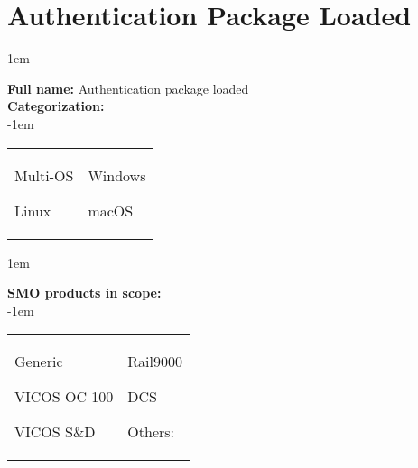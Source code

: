 
%
%

\section{Authentication Package Loaded}
\label{15010}

\openup 1em

\textbf{Full name:} Authentication package loaded\hrulefill \\
{\bf Categorization:} \\

\openup -1em
\vspace{-3em}

\begin{tabular}{p{}p{}}

\begin{todolist}
  	\item Multi-OS
	\item Linux
\end{todolist}
&
\begin{todolist}
	\item[\done] Windows
	\item macOS
\end{todolist}

\end{tabular}

\openup 1em

{\bf SMO products in scope:} \\

\openup -1em
\vspace{-3em}

\begin{tabular}{p{}p{}}

\begin{todolist}
  \item[\done] Generic
  \item VICOS OC 100
  \item VICOS S\&D
\end{todolist}
&
\begin{todolist}
  \item Rail9000
  \item DCS
  \item Others: \hrulefill
\end{todolist}

\end{tabular}

